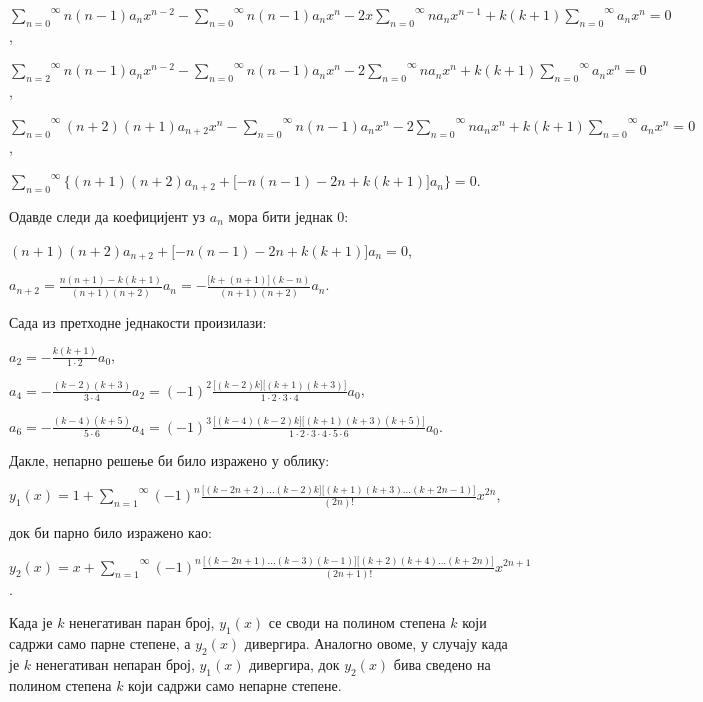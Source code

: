 \(\overset{\infty}{\sum_{n = 0}}n(n - 1)a_{n}x^{n - 2} - \overset{\infty}{\sum_{n = 0}}n(n - 1)a_{n}x^{n} - 2x\overset{\infty}{\sum_{n = 0}}na_{n}x^{n - 1} + k(k + 1)\overset{\infty}{\sum_{n = 0}}a_{n}x^{n} = 0\),

\(\overset{\infty}{\sum_{n = 2}}n(n - 1)a_{n}x^{n - 2} - \overset{\infty}{\sum_{n = 0}}n(n - 1)a_{n}x^{n} - 2\overset{\infty}{\sum_{n = 0}}na_{n}x^{n} + k(k + 1)\overset{\infty}{\sum_{n = 0}}a_{n}x^{n} = 0\),

\(\overset{\infty}{\sum_{n = 0}}(n + 2)(n + 1)a_{n + 2}x^{n} - \overset{\infty}{\sum_{n = 0}}n(n - 1)a_{n}x^{n} - 2\overset{\infty}{\sum_{n = 0}}na_{n}x^{n} + k(k + 1)\overset{\infty}{\sum_{n = 0}}a_{n}x^{n} = 0\),

\(\overset{\infty}{\sum_{n = 0}}\{(n + 1)(n + 2)a_{n + 2} + \lbrack - n(n - 1) - 2n + k(k + 1)\rbrack a_{n}\} = 0\).

Одавде следи да коефицијент уз \(a_{n}\) мора бити једнак 0:

\((n + 1)(n + 2)a_{n + 2} + \lbrack - n(n - 1) - 2n + k(k + 1)\rbrack a_{n} = 0\),

\(a_{n + 2} = \frac{n(n + 1) - k(k + 1)}{(n + 1)(n + 2)}a_{n} = - \frac{\lbrack k + (n + 1)\rbrack(k - n)}{(n + 1)(n + 2)}a_{n}\).

Сада из претходне једнакости произилази:

\(a_{2} = - \frac{k(k + 1)}{1 \cdot 2}a_{0}\),

\(a_{4} = - \frac{(k - 2)(k + 3)}{3 \cdot 4}a_{2} = {( - 1)}^{2}\frac{\lbrack(k - 2)k\rbrack\lbrack(k + 1)(k + 3)\rbrack}{1 \cdot 2 \cdot 3 \cdot 4}a_{0}\),

\(a_{6} = - \frac{(k - 4)(k + 5)}{5 \cdot 6}a_{4} = {( - 1)}^{3}\frac{\lbrack(k - 4)(k - 2)k\rbrack\lbrack(k + 1)(k + 3)(k + 5)\rbrack}{1 \cdot 2 \cdot 3 \cdot 4 \cdot 5 \cdot 6}a_{0}\).

Дакле, непарно решење би било изражено у облику:

\(y_{1}(x) = 1 + \overset{\infty}{\sum_{n = 1}}{( - 1)}^{n}\frac{\lbrack(k - 2n + 2)...(k - 2)k\rbrack\lbrack(k + 1)(k + 3)...(k + 2n - 1)\rbrack}{(2n)!}x^{2n}\),

док би парно било изражено као:

\(y_{2}(x) = x + \overset{\infty}{\sum_{n = 1}}{( - 1)}^{n}\frac{\lbrack(k - 2n + 1)...(k - 3)(k - 1)\rbrack\lbrack(k + 2)(k + 4)...(k + 2n)\rbrack}{(2n + 1)!}x^{2n + 1}\).

Када је \(k\) ненегативан паран број, \(y_{1}(x)\) се своди на полином
степена \(k\) који садржи само парне степене, а \(y_{2}(x)\) дивергира.
Аналогно овоме, у случају када је \(k\) ненегативан непаран број,
\(y_{1}(x)\) дивергира, док \(y_{2}(x)\) бива сведено на полином степена
\(k\) који садржи само непарне степене.

